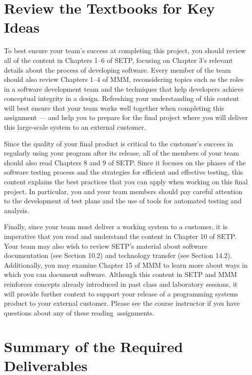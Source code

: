 \section*{Review the Textbooks for Key Ideas}

To best ensure your team's success at completing this project, you should review all of the content in Chapters 1--6 of
SETP, focusing on Chapter 3's relevant details about the process of developing software. Every member of the team should
also review Chapters 1--4 of MMM, reconsidering topics such as the roles in a software development team and the
techniques that help developers achieve conceptual integrity in a design. Refreshing your understanding of this content
will best ensure that your team works well together when completing this assignment --- and help you to prepare for the
final project where you will deliver this large-scale system to an external customer.

Since the quality of your final product is critical to the customer's success in regularly using your program after its
release, all of the members of your team should also read Chapters 8 and 9 of SETP. Since it focuses on the phases of
the software testing process and the strategies for efficient and effective testing, this content explains the best
practices that you can apply when working on this final project. In particular, you and your team members should pay
careful attention to the development of test plans and the use of tools for automated testing and analysis.

 Finally, since your team must deliver a working system to a customer, it is imperative that you read and understand the
 content in Chapter 10 of SETP. Your team may also wish to review SETP's material about software documentation (see
 Section 10.2) and technology transfer (see Section 14.2).  Additionally, you may examine Chapter 15 of MMM to learn
 more about ways in which you can document software. Although this content in SETP and MMM reinforces concepts already
 introduced in past class and laboratory sessions, it will provide further context to support your release of a
 programming systems product to your external customer.  Please see the course instructor if you have questions about
 any of these \mbox{reading assignments}.

\section*{Summary of the Required Deliverables}

